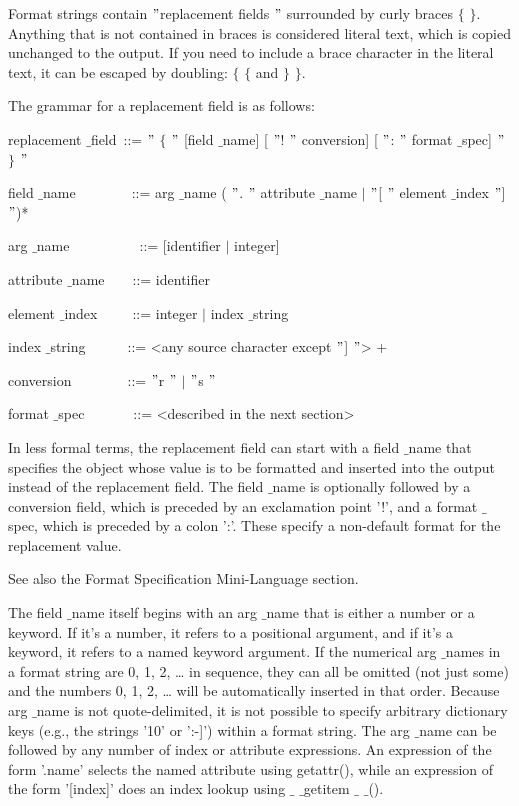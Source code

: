 Format strings contain  $ " $replacement fields $ " $ surrounded by curly braces  $  \{  $ $  \}  $. Anything that is not contained in braces is considered literal text, which is copied unchanged to the output. If you need to include a brace character in the literal text, it can be escaped by doubling:  $  \{  $ $  \{  $ and  $  \}  $ $  \}  $. \par
The grammar for a replacement field is as follows: \par
replacement $  \_  $field~::=   $ " $ $  \{  $ $ " $ [field $  \_  $name] [ $ " $! $ " $ conversion] [ $ " $: $ " $ format $  \_  $spec]  $ " $ $  \}  $ $ " $ \par
field $  \_  $name~~~~~~~~::=  arg $  \_  $name ( $ " $. $ " $ attribute $  \_  $name  $  \vert  $  $ " $[ $ " $ element $  \_  $index  $ " $] $ " $)* \par
arg $  \_  $name~~~~~~~~~~::=  [identifier  $  \vert  $ integer] \par
attribute $  \_  $name~~~~::=  identifier \par
element $  \_  $index~~~~~::=  integer  $  \vert  $ index $  \_  $string \par
index $  \_  $string~~~~~~::=  <any source character except  $ " $] $ " $> + \par
conversion~~~~~~~~::=   $ " $r $ " $  $  \vert  $  $ " $s $ " $ \par
format $  \_  $spec~~~~~~~::=  <described in the next section> \par
In less formal terms, the replacement field can start with a field $  \_  $name that specifies the object whose value is to be formatted and inserted into the output instead of the replacement field. The field $  \_  $name is optionally followed by a conversion field, which is preceded by an exclamation point '!', and a format $  \_  $spec, which is preceded by a colon ':'. These specify a non-default format for the replacement value. \par
See also the Format Specification Mini-Language section. \par
The field $  \_  $name itself begins with an arg $  \_  $name that is either a number or a keyword. If it’s a number, it refers to a positional argument, and if it’s a keyword, it refers to a named keyword argument. If the numerical arg $  \_  $names in a format string are 0, 1, 2, … in sequence, they can all be omitted (not just some) and the numbers 0, 1, 2, … will be automatically inserted in that order. Because arg $  \_  $name is not quote-delimited, it is not possible to specify arbitrary dictionary keys (e.g., the strings '10' or ':-]') within a format string. The arg $  \_  $name can be followed by any number of index or attribute expressions. An expression of the form '.name' selects the named attribute using getattr(), while an expression of the form '[index]' does an index lookup using  $  \_  $ $  \_  $getitem $  \_  $ $  \_  $(). \par

